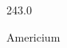 \documentclass[12pt]{article}
\begin{document}
\hfill{}
\vfill
\begin{center}
  {\fontsize{50}{60}
  }

  243.0

Americium
\end{center}
\vfill
\end{document}

